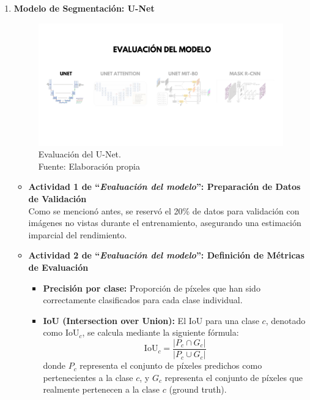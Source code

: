 \begin{enumerate}
  \item \textbf{Modelo de Segmentación: U-Net}
  \begin{figure}[H]
	\begin{center}
		\includegraphics[width=1\textwidth]{4/figures/evunet.png}
		\caption[Evaluación del U-Net]{Evaluación del U-Net.\\
		Fuente: Elaboración propia}
		\label{4:figevunet}
	\end{center}
\end{figure}

  \begin{itemize}
  \item\textbf{Actividad 1 de “\textit{Evaluación del modelo}”: Preparación de Datos de Validación}
  \\
  Como se mencionó antes, se reservó el 20\% de datos para validación con imágenes no vistas durante el entrenamiento, asegurando una estimación imparcial del rendimiento.
  
  \item\textbf{Actividad 2 de “\textit{Evaluación del modelo}”: Definición de Métricas de Evaluación}
  \begin{itemize}
  \item \textbf{Precisión por clase:} Proporción de píxeles que han sido correctamente clasificados para cada clase individual.

  \item \textbf{IoU (Intersection over Union):} El IoU para una clase $c$, denotado como $\text{IoU}_c$, se calcula mediante la siguiente fórmula:
$$\text{IoU}_c = \frac{|P_c \cap G_c|}{|P_c \cup G_c|}$$
donde $P_c$ representa el conjunto de píxeles predichos como pertenecientes a la clase $c$, y $G_c$ representa el conjunto de píxeles que realmente pertenecen a la clase $c$ (ground truth).


\end{itemize}
\end{itemize}
\end{enumerate}
